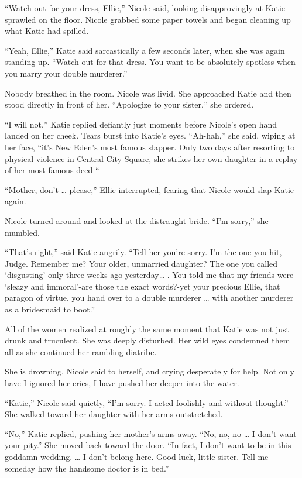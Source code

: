 \documentclass[]{article}
\begin{document}
{“Watch out for your dress, Ellie,” Nicole said, looking disapprovingly at Katie sprawled on the floor. Nicole grabbed some paper towels and began cleaning up what Katie had spilled.

“Yeah, Ellie,” Katie said sarcastically a few seconds later, when she was again standing up. “Watch out for that dress. You want to be absolutely spotless when you marry your double murderer.”

Nobody breathed in the room. Nicole was livid. She approached Katie and then stood directly in front of her. “Apologize to your sister,” she ordered.

“I will not,” Katie replied defiantly just moments before Nicole’s open hand landed on her cheek. Tears burst into Katie’s eyes. “Ah-hah,” she said, wiping at her face, “it’s New Eden’s most famous slapper. Only two days after resorting to physical violence in Central City Square, she strikes her own daughter in a replay of her most famous deed-“

“Mother, don’t … please,” Ellie interrupted, fearing that Nicole would slap Katie again.

Nicole turned around and looked at the distraught bride. “I’m sorry,” she mumbled.

“That’s right,” said Katie angrily. “Tell her you’re sorry. I’m the one you hit, Judge. Remember me? Your older, unmarried daughter? The one you called ‘disgusting’ only three weeks ago yesterday… . You told me that my friends were ‘sleazy and immoral’-are those the exact words?-yet your precious Ellie, that paragon of virtue, you hand over to a double murderer … with another murderer as a bridesmaid to boot.”

All of the women realized at roughly the same moment that Katie was not just drunk and truculent. She was deeply disturbed. Her wild eyes condemned them all as she continued her rambling diatribe.

She is drowning, Nicole said to herself, and crying desperately for help. Not only have I ignored her cries, I have pushed her deeper into the water.

“Katie,” Nicole said quietly, “I’m sorry. I acted foolishly and without thought.” She walked toward her daughter with her arms outstretched.

“No,” Katie replied, pushing her mother’s arms away. “No, no, no … I don’t want your pity.” She moved back toward the door. “In fact, I don’t want to be in this goddamn wedding. … I don’t belong here. Good luck, little sister. Tell me someday how the handsome doctor is in bed.”

}
\end{document}
